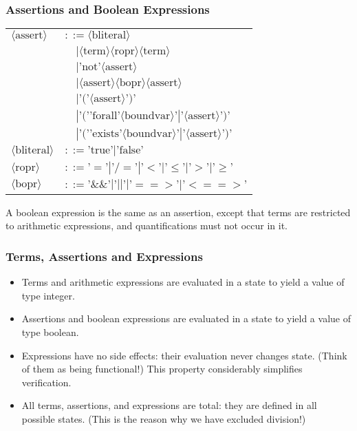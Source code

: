 \begin{multicols}{2}
\subsubsection{Assertions and Boolean Expressions}
\begin{tabularx}{\linewidth}{Xl}
  $\langle \text{assert} \rangle$ & $::= \langle \text{bliteral} \rangle$\\
   & $\quad | \langle \text{term} \rangle \langle \text{ropr} \rangle \langle \text{term} \rangle$\\
   & $\quad | \text{'not'} \langle \text{assert} \rangle$\\
   & $\quad | \langle \text{assert} \rangle \langle \text{bopr} \rangle \langle \text{assert} \rangle$\\
   & $\quad | \text{'('} \langle \text{assert} \rangle \text{')'}$\\
   & $\quad | \text{'('} \text{'forall'} \langle \text{boundvar} \rangle \text{'} | \text{'} \langle \text{assert} \rangle \text{')'}$\\
   & $\quad | \text{'('} \text{'exists'} \langle \text{boundvar} \rangle \text{'} | \text{'} \langle \text{assert} \rangle \text{')'}$\\
  $\langle \text{bliteral} \rangle$ & $::= \text{'true'} | \text{'false'}$\\
  $\langle \text{ropr} \rangle$ & $::= \text{'}=\text{'} | \text{'}/=\text{'} | \text{'}<\text{'} | \text{'}\leq\text{'} | \text{'}>\text{'} | \text{'}\geq\text{'}$\\
  $\langle \text{bopr} \rangle$ & $::= \text{'}\&\&\text{'} | \text{'}||\text{'} | \text{'}==>\text{'} | \text{'}<==>\text{'}$\\
\end{tabularx}
A boolean expression is the same as an assertion, except that terms are restricted to arithmetic expressions, and quantifications must not occur in it.


\subsubsection{Terms, Assertions and Expressions}
\begin{itemize}
  \item Terms and arithmetic expressions are evaluated in a state to yield a value of type integer.
  \item Assertions and boolean expressions are evaluated in a state to yield a value of type boolean.
  \item Expressions have no side effects: their evaluation never changes state. (Think of them as being functional!) This property considerably simplifies verification.
  \item All terms, assertions, and expressions are total: they are defined in all possible states. (This is the reason why we have excluded division!)
\end{itemize}


\end{multicols}
